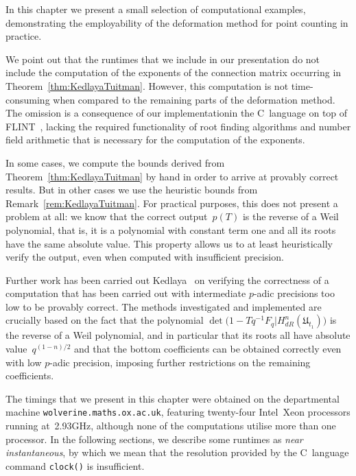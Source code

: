 
In this chapter we present a small selection of computational examples, 
demonstrating the employability of the deformation method for point counting 
in practice.

We point out that the runtimes that we include in our presentation 
do not include the computation of the exponents of the connection 
matrix occurring in Theorem~\ref{thm:KedlayaTuitman}.  However, 
this computation is not time-consuming when compared to the remaining 
parts of the deformation method.  The omission is a consequence of 
our implementation\footnotemark in the C~language on top of 
FLINT~\citep{FLINT}, lacking the required functionality of root finding 
algorithms and number field arithmetic that is necessary for the 
computation of the exponents.


In some cases, we compute the bounds derived from 
Theorem~\ref{thm:KedlayaTuitman} by hand in order to arrive at 
provably correct results.  But in other cases we use the heuristic 
bounds from Remark~\ref{rem:KedlayaTuitman}.  For practical purposes, 
this does not present a problem at all:  we know that the correct 
output~$p(T)$ is the reverse of a Weil polynomial, that is, 
it is a polynomial with constant term one and all its roots have 
the same absolute value.  This property allows us to at least 
heuristically verify the output, even when computed with insufficient 
precision.

Further work has been carried out Kedlaya~\citep{Kedlaya2008} on 
verifying the correctness of a computation that has been carried out 
with intermediate $p$-adic precisions too low to be provably correct. 
The methods investigated and implemented are crucially based on the 
fact that the polynomial 
\mbox{$\det\bigl(1 - T q^{-1} F_q | H_{dR}^{n}(\mathfrak{U}_{t_1})\bigr)$} 
is the reverse of a Weil polynomial, and in particular that its 
roots all have absolute value~$q^{(1-n)/2}$ and that the bottom 
coefficients can be obtained correctly even with low $p$-adic precision, 
imposing further restrictions on the remaining coefficients.

The timings that we present in this chapter were obtained on the 
departmental machine {\tt{wolverine.maths.ox.ac.uk}}, featuring twenty-four 
\mbox{Intel Xeon} processors running at~2.93GHz, although none of the 
computations utilise more than one processor.  In the following sections, 
we describe some runtimes as \emph{near instantaneous}, by which we mean 
that the resolution provided by the C~language command {\tt{clock()}} is 
insufficient.


